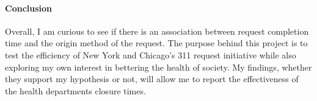 \documentclass[12pt]{article}
\begin{document}
\paragraph{Conclusion}
Overall, I am curious to see if there is an association between request completion time and the origin method of the request. 
The purpose behind this project is to test the efficiency of New York and Chicago’s 311 request initiative while also exploring my own interest in bettering the health of society. 
My findings, whether they support my hypothesis or not, will allow me to report the effectiveness of the health departments closure times. 
\end{document}
